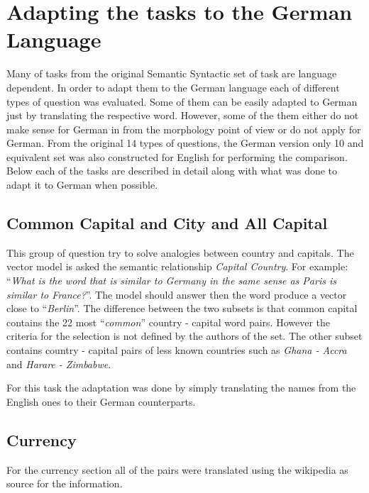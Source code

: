 \section{Adapting the tasks to the German Language}
\label{sec:adapt_task_german_lang}

Many of  tasks from the original  Semantic Syntactic set of task are language
dependent. In order to adapt them  to the German language  each of different
types of question was evaluated. Some of them can be easily adapted to German
just by translating the respective word. However, some of the them either do
not make sense for German in from the morphology point of view or do not
apply for German. From the original 14 types of questions, the German version only
10 and equivalent set was also constructed for English for performing the
comparison. Below each of the tasks are described in detail along with what
was done to adapt it to German when possible.

\subsection{Common Capital and City and All Capital}
\label{sec:sub_sec_common_capital_country}

This group of question try to solve analogies between country and capitals.
The vector model is asked the semantic relationship \emph{Capital Country}.
For example:  ``\emph{What is the word that is similar to
Germany in the same sense as Paris is similar to France?}''. The model should
answer then the word produce a vector close to ``\emph{Berlin}''. The
difference between the two subsets is that common capital contains
 the 22 most ``\textit{common}'' country - capital word pairs. However the
 criteria for the selection is not defined by the authors of the set. The
 other subset contains country - capital pairs of less known countries such
 as \textit{Ghana  -  Accra} and  \textit{Harare -  Zimbabwe}.

For this task the adaptation was done by simply translating the names from
the English ones to their German counterparts. 

\subsection{Currency}
\label{sec:sub_sec_currency}
For the currency section all of the pairs were translated using the wikipedia
as source for the information. 

